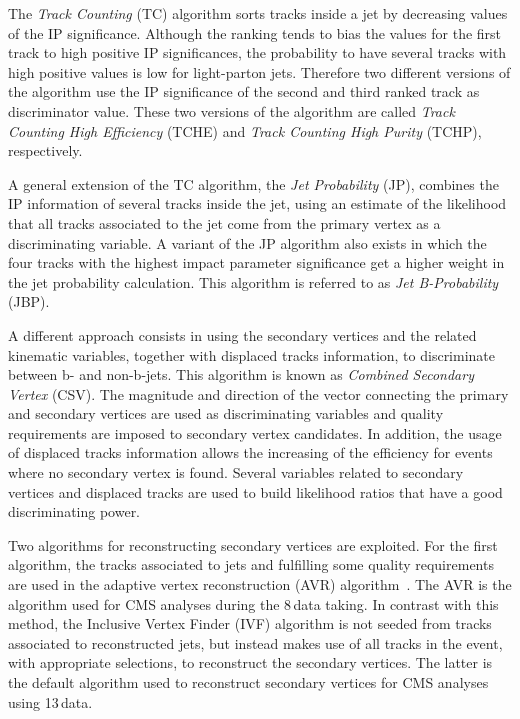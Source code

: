 The \emph{Track Counting} (TC) algorithm sorts tracks inside a jet by decreasing values of the IP significance. Although the ranking tends to bias the values for the first track to high positive IP significances, the probability to have several tracks with high positive values is low for light-parton jets. Therefore two different versions of the algorithm use the IP significance of the second and third ranked track as discriminator value.  These two versions of the algorithm are called \emph{Track Counting High Efficiency} (TCHE) and \emph{Track Counting High Purity} (TCHP), respectively.

A general extension of the TC algorithm, the \emph{Jet Probability} (JP), combines the IP information of several tracks inside the jet, using an estimate of the likelihood that all tracks associated to the jet come from the primary vertex as a discriminating variable. A variant of
the JP algorithm also exists in which the four tracks with the highest impact parameter significance get a higher weight in the jet probability calculation. This algorithm is referred to as \emph{Jet B-Probability} (JBP).

A different approach consists in using the secondary vertices and the related kinematic variables, together with displaced tracks information, to discriminate between b- and non-b-jets. This algorithm is known as \emph{Combined Secondary Vertex} (CSV). The magnitude and direction of the vector connecting the primary and secondary vertices are used as discriminating variables and quality requirements are imposed to secondary vertex candidates. In addition, the usage of displaced tracks information allows the increasing of the efficiency for events where no secondary vertex is found. Several variables related to secondary vertices and displaced tracks are used to build likelihood ratios that have a good discriminating power.

Two algorithms for reconstructing secondary vertices are exploited. For the first algorithm, the
tracks associated to jets and fulfilling some quality requirements are used in the adaptive vertex reconstruction (AVR) algorithm~\cite{Waltenberger:1166320}. The AVR is the algorithm used for CMS analyses during the 8\,\TeV data taking. In contrast with this method, the Inclusive Vertex Finder (IVF) algorithm is not seeded from tracks associated to reconstructed jets, but instead makes use of all tracks in the event, with appropriate selections, to reconstruct the secondary vertices. The latter is the default algorithm used to reconstruct secondary vertices for CMS analyses using 13\,\TeV data.

